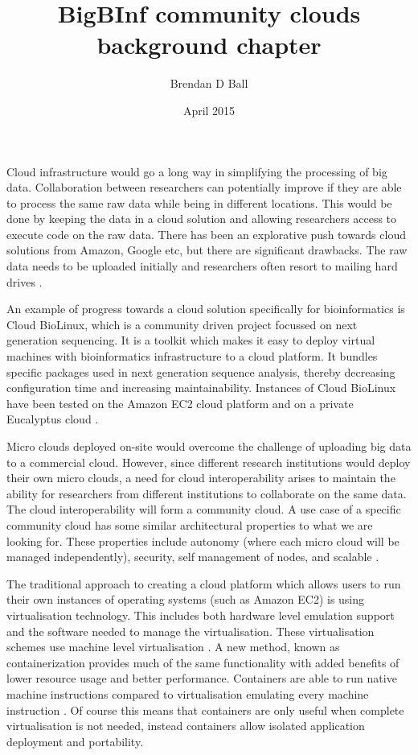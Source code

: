 \documentclass[prodmode,acmtecs]{acmsmall}
\begin{document}

\title{BigBInf community clouds background chapter} %
\author{Brendan D Ball
}
\date{April 2015}

\section{}
Cloud infrastructure would go a long way in simplifying the processing of big data. Collaboration between researchers can potentially improve if they are able to process the same raw data while being in different locations. This would be done by keeping the data in a cloud solution and allowing researchers access to execute code on the raw data. There has been an explorative push towards cloud solutions from Amazon, Google etc, but there are significant drawbacks. The raw data needs to be uploaded initially and researchers often resort to mailing hard drives \cite{baker2010next}. 

An example of progress towards a cloud solution specifically for bioinformatics is Cloud BioLinux, which is a community driven project focussed on next generation sequencing. It is a toolkit which makes it easy to deploy virtual machines with bioinformatics infrastructure to a cloud platform. It bundles specific packages used in next generation sequence analysis, thereby decreasing configuration time and increasing maintainability. Instances of Cloud BioLinux have been tested on the Amazon EC2 cloud platform and on a private Eucalyptus cloud \cite{krampis2012cloud}.

Micro clouds deployed on-site would overcome the challenge of uploading big data to a commercial cloud. However, since different research institutions would deploy their own micro clouds, a need for cloud interoperability arises to maintain the ability for researchers from different institutions to collaborate on the same data. The cloud interoperability will form a community cloud. A use case of a specific community cloud has some similar architectural properties to what we are looking for. These properties include autonomy (where each micro cloud will be managed independently), security, self management of nodes, and scalable \cite{jimenez2014deploying}.

The traditional approach to creating a cloud platform which allows users to run their own instances of operating systems (such as Amazon EC2) is using virtualisation technology. This includes both hardware level emulation support and the software needed to manage the virtualisation. These virtualisation schemes use machine level virtualisation \cite{fink2014docker}. A new method, known as containerization provides much of the same functionality with added benefits of lower resource usage and better performance. Containers are able to run native machine instructions compared to virtualisation emulating every machine instruction \cite{dua2014virtualization}. Of course this means that containers are only useful when complete virtualisation is not needed, instead containers allow isolated application deployment and portability.

\appendix


\end{document}
